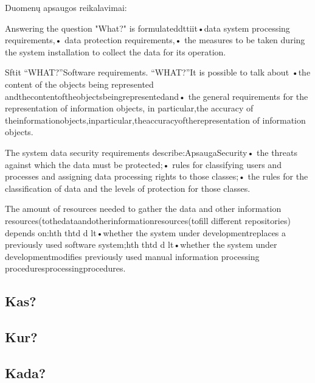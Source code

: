 \documentclass{VUMIFPSkursinis}
\begin{document}
Duomenų apsaugos reikalavimai: 

Answering the question "What?" is formulateddttiit•data system processing requirements,•  data protection requirements,•  the measures to be taken during the system installation to collect the data for its operation.

Sftit  “WHAT?”Software requirements. “WHAT?”It is possible to talk about •the content of the objects being represented andthecontentoftheobjectsbeingrepresentedand•   the general requirements for the representation of information objects, in particular,the accuracy of theinformationobjects,inparticular,theaccuracyoftherepresentation of information objects.

The system data security requirements describe:ApsaugaSecurity•   the threats against which the data must be protected;•   rules for classifying users and processes and assigning data processing rights to those classes;•   the rules for the classification of data and the levels of protection for those classes.

The amount of resources needed to gather the data and other information resources(tothedataandotherinformationresources(tofill different repositories) depends on:hth  thtd  d    lt•whether the system under developmentreplaces a previously used software system;hth  thtd  d    lt•whether the system under developmentmodifies previously used manual information processing proceduresprocessingprocedures.

\subsection{Kas?}\label{sec:PSReqWho}
\subsection{Kur?}\label{sec:PSReqWhere}
\subsection{Kada?}\label{sec:PSReqWhen}
\end{document}
